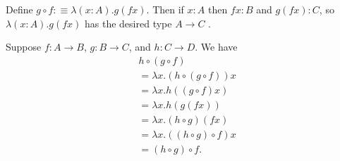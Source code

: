 \documentclass[12pt]{book}
\begin{document}
Define \(g \circ f :\equiv \lambda (x : A) . g ( f x )\). Then if \(x : A\) then \(f x  : B\) and \(g ( f x ) : C\), so \(\lambda (x : A) . g ( f x )\) has the desired type \(A \rightarrow C\) .

Suppose \( f: A \rightarrow B\), \(g : B \rightarrow C\), and \(h : C \rightarrow D\). We have
\begin{align*} 
&h \circ (g \circ f) \\
&=\lambda x . (h \circ (g \circ f)) x \\
&= \lambda x . h ((g \circ f) x) \\
&=\lambda x . h ( g (f x)) \\
&=\lambda x . (h \circ g) (f x) \\
&= \lambda x . ((h \circ g) \circ f) x \\
&= (h \circ g) \circ f.
\end{align*}
\end{document}
